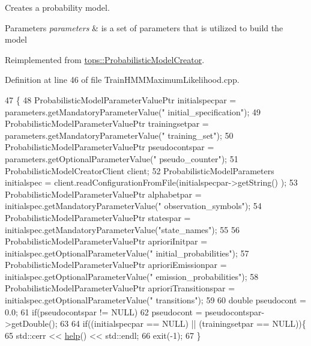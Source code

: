 Creates a probability model. 


\begin{DoxyParams}{Parameters}
{\em parameters} & is a set of parameters that is utilized to build the model \\
\hline
\end{DoxyParams}


Reimplemented from \hyperlink{classtops_1_1ProbabilisticModelCreator_afed6c8ffa45fff446bdaa8b533da8f7c}{tops\+::\+Probabilistic\+Model\+Creator}.



Definition at line 46 of file Train\+H\+M\+M\+Maximum\+Likelihood.\+cpp.


\begin{DoxyCode}
47   \{
48     ProbabilisticModelParameterValuePtr initialspecpar = parameters.getMandatoryParameterValue(\textcolor{stringliteral}{"
      initial\_specification"});
49     ProbabilisticModelParameterValuePtr trainingsetpar = parameters.getMandatoryParameterValue(\textcolor{stringliteral}{"
      training\_set"});
50     ProbabilisticModelParameterValuePtr pseudocontspar = parameters.getOptionalParameterValue(\textcolor{stringliteral}{"
      pseudo\_counter"});
51     ProbabilisticModelCreatorClient client;
52     ProbabilisticModelParameters initialspec = client.readConfigurationFromFile(initialspecpar->getString()
      );
53     ProbabilisticModelParameterValuePtr alphabetpar = initialspec.getMandatoryParameterValue(\textcolor{stringliteral}{"
      observation\_symbols"});
54     ProbabilisticModelParameterValuePtr statespar = initialspec.getMandatoryParameterValue(\textcolor{stringliteral}{"state\_names"});
55 
56     ProbabilisticModelParameterValuePtr aprioriInitpar = initialspec.getOptionalParameterValue(\textcolor{stringliteral}{"
      initial\_probabilities"});
57     ProbabilisticModelParameterValuePtr aprioriEmissionpar = initialspec.getOptionalParameterValue(\textcolor{stringliteral}{"
      emission\_probabilities"});
58     ProbabilisticModelParameterValuePtr aprioriTransitionspar = initialspec.getOptionalParameterValue(\textcolor{stringliteral}{"
      transitions"});
59  
60     \textcolor{keywordtype}{double} pseudocont = 0.0;
61     \textcolor{keywordflow}{if}(pseudocontspar != NULL)
62       pseudocont = pseudocontspar->getDouble();
63 
64     \textcolor{keywordflow}{if}((initialspecpar == NULL) || (trainingsetpar == NULL))\{
65       std::cerr << \hyperlink{classtops_1_1TrainHMMMaximumLikelihood_a26826dc0cd793cf5d026a4d8b6daa8fc}{help}() << std::endl;
66       exit(-1);
67     \}

\end{DoxyCode}
